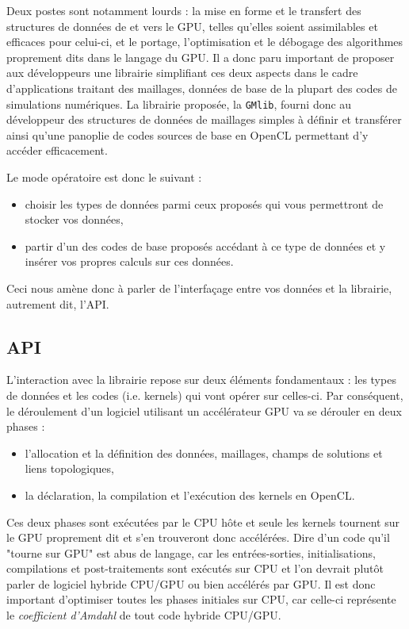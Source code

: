 \documentclass[a4paper,12pt]{article}
\begin{document}
Deux postes sont notamment lourds : la mise en forme et le transfert des structures de données de et vers le GPU, telles qu'elles soient assimilables et efficaces pour celui-ci, et le portage, l'optimisation et le débogage des algorithmes proprement dits dans le langage du GPU.
Il a donc paru important de proposer aux développeurs une librairie simplifiant ces deux aspects dans le cadre d'applications traitant des maillages, données de base de la plupart des codes de simulations numériques. La librairie proposée, la {\tt GMlib}, fourni donc au développeur des structures de données de maillages simples à définir et transférer ainsi qu'une panoplie de codes sources de base en OpenCL permettant d'y accéder efficacement.

Le mode opératoire est donc le suivant :

\begin{itemize}
\item choisir les types de données parmi ceux proposés qui vous permettront de stocker vos données,
\item partir d'un des codes de base proposés accédant à ce type de données et y insérer vos propres calculs sur ces données.
\end{itemize}

Ceci nous amène donc à parler de l'interfaçage entre vos données et la librairie, autrement dit, l'API.


\subsection{API}
\label{sec:API}
L'interaction avec la librairie repose sur deux éléments fondamentaux : les types de données et les codes (i.e. kernels) qui vont opérer sur celles-ci. Par conséquent, le déroulement d'un logiciel utilisant un accélérateur GPU va se dérouler en deux phases :

\begin{itemize}
\item l'allocation et la définition des données, maillages, champs de solutions et liens topologiques,
\item la déclaration, la compilation et l'exécution des kernels en OpenCL.
\end{itemize}

Ces deux phases sont exécutées par le CPU hôte et seule les kernels tournent sur le GPU proprement dit et s'en trouveront donc accélérées. Dire d'un code qu'il "tourne sur GPU" est abus de langage, car les entrées-sorties, initialisations, compilations et post-traitements sont exécutés sur CPU et l'on devrait plutôt parler de logiciel hybride CPU/GPU ou bien accélérés par GPU. Il est donc important d'optimiser toutes les phases initiales sur CPU, car celle-ci représente le \emph{coefficient d'Amdahl} de tout code hybride CPU/GPU.
\end{document}
